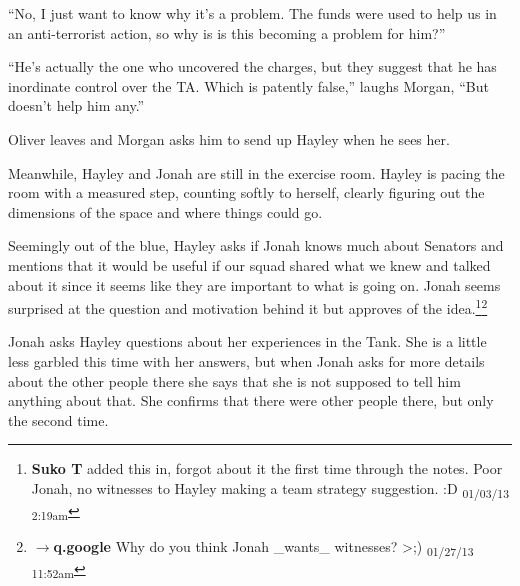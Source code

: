 ``No, I just want to know why it's a problem.  The funds were used to help us in an anti-terrorist action, so why is is this becoming a problem for him?''

``He's actually the one who uncovered the charges, but they suggest that he has inordinate control over the TA.  Which is patently false,'' laughs Morgan, ``But doesn't help him any.''  



Oliver leaves and Morgan asks him to send up Hayley when he sees her.



Meanwhile, Hayley and Jonah are still in the exercise room.  Hayley is pacing the room with a measured step, counting softly to herself, clearly figuring out the dimensions of the space and where things could go.  



Seemingly out of the blue, Hayley asks if Jonah knows much about Senators and mentions that it would be useful if our squad shared what we knew and talked about it since it seems like they are important to what is going on.  Jonah seems surprised at the question and motivation behind it but approves of the idea.\footnote{\textbf{Suko T }added this in, forgot about it the first time through the notes.  Poor Jonah, no witnesses to Hayley making a team strategy suggestion. :D \textsubscript{01/03/13 2:19am}}\footnote{$\rightarrow$\textbf{q.google }Why do you think Jonah \_wants\_ witnesses? \textgreater ;) \textsubscript{01/27/13 11:52am}}



Jonah asks Hayley questions about her experiences in the Tank.  She is a little less garbled this time with her answers, but when Jonah asks for more details about the other people there she says that she is not supposed to tell him anything about that.  She confirms that there were other people there, but only the second time.




